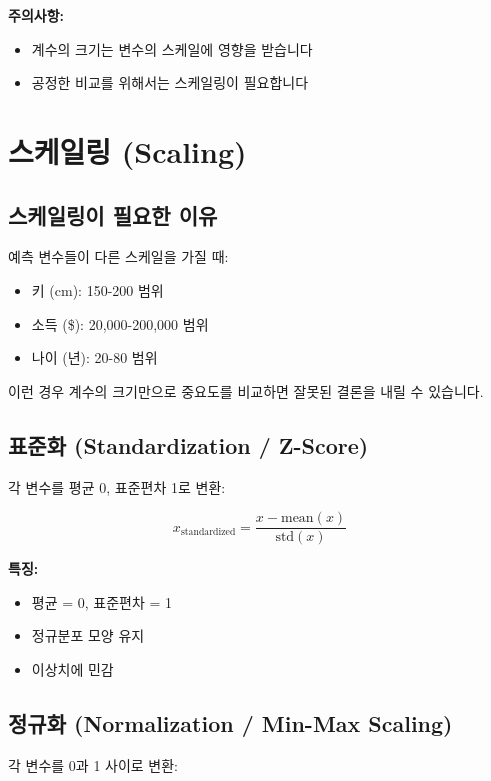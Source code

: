 \documentclass[12pt]{article}
\begin{document}
\textbf{주의사항:}
\begin{itemize}
    \item 계수의 크기는 변수의 스케일에 영향을 받습니다
    \item 공정한 비교를 위해서는 스케일링이 필요합니다
\end{itemize}

\section{스케일링 (Scaling)}

\subsection{스케일링이 필요한 이유}

예측 변수들이 다른 스케일을 가질 때:
\begin{itemize}
    \item 키 (cm): 150-200 범위
    \item 소득 (\$): 20,000-200,000 범위
    \item 나이 (년): 20-80 범위
\end{itemize}

이런 경우 계수의 크기만으로 중요도를 비교하면 잘못된 결론을 내릴 수 있습니다.

\subsection{표준화 (Standardization / Z-Score)}

각 변수를 평균 0, 표준편차 1로 변환:

\begin{equation}
x_{\text{standardized}} = \frac{x - \text{mean}(x)}{\text{std}(x)}
\end{equation}

\textbf{특징:}
\begin{itemize}
    \item 평균 = 0, 표준편차 = 1
    \item 정규분포 모양 유지
    \item 이상치에 민감
\end{itemize}

\subsection{정규화 (Normalization / Min-Max Scaling)}

각 변수를 0과 1 사이로 변환:
\end{document}
